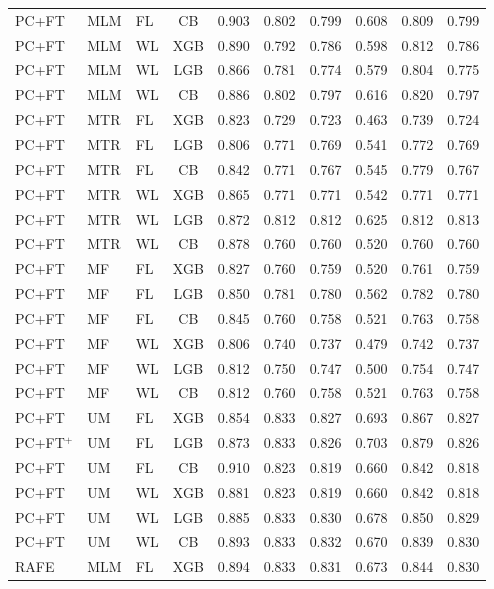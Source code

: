 \documentclass[9pt,a4paper]{article}
\begin{document}
\begin{scriptsize}
\begin{longtable}{lllcrrrrrr}
PC+FT & MLM & FL & CB  & 0.903 & 0.802 & 0.799 & 0.608 & 0.809 & 0.799 \\
PC+FT & MLM & WL & XGB & 0.890 & 0.792 & 0.786 & 0.598 & 0.812 & 0.786 \\
PC+FT & MLM & WL & LGB & 0.866 & 0.781 & 0.774 & 0.579 & 0.804 & 0.775 \\
PC+FT & MLM & WL & CB  & 0.886 & 0.802 & 0.797 & 0.616 & 0.820 & 0.797 \\
PC+FT & MTR & FL & XGB & 0.823 & 0.729 & 0.723 & 0.463 & 0.739 & 0.724 \\
PC+FT & MTR & FL & LGB & 0.806 & 0.771 & 0.769 & 0.541 & 0.772 & 0.769 \\
PC+FT & MTR & FL & CB  & 0.842 & 0.771 & 0.767 & 0.545 & 0.779 & 0.767 \\
PC+FT & MTR & WL & XGB & 0.865 & 0.771 & 0.771 & 0.542 & 0.771 & 0.771 \\
PC+FT & MTR & WL & LGB & 0.872 & 0.812 & 0.812 & 0.625 & 0.812 & 0.813 \\
PC+FT & MTR & WL & CB  & 0.878 & 0.760 & 0.760 & 0.520 & 0.760 & 0.760 \\
PC+FT & MF  & FL & XGB & 0.827 & 0.760 & 0.759 & 0.520 & 0.761 & 0.759 \\
PC+FT & MF  & FL & LGB & 0.850 & 0.781 & 0.780 & 0.562 & 0.782 & 0.780 \\
PC+FT & MF  & FL & CB  & 0.845 & 0.760 & 0.758 & 0.521 & 0.763 & 0.758 \\
PC+FT & MF  & WL & XGB & 0.806 & 0.740 & 0.737 & 0.479 & 0.742 & 0.737 \\
PC+FT & MF  & WL & LGB & 0.812 & 0.750 & 0.747 & 0.500 & 0.754 & 0.747 \\
PC+FT & MF  & WL & CB  & 0.812 & 0.760 & 0.758 & 0.521 & 0.763 & 0.758 \\
PC+FT & UM  & FL & XGB & 0.854 & 0.833 & 0.827 & 0.693 & 0.867 & 0.827 \\
PC+FT$^+$ & UM & FL & LGB & 0.873 & 0.833 & 0.826 & 0.703 & 0.879 & 0.826 \\
PC+FT & UM  & FL & CB  & 0.910 & 0.823 & 0.819 & 0.660 & 0.842 & 0.818 \\
PC+FT & UM  & WL & XGB & 0.881 & 0.823 & 0.819 & 0.660 & 0.842 & 0.818 \\
PC+FT & UM  & WL & LGB & 0.885 & 0.833 & 0.830 & 0.678 & 0.850 & 0.829 \\
PC+FT & UM  & WL & CB  & 0.893 & 0.833 & 0.832 & 0.670 & 0.839 & 0.830 \\
\midrule
RAFE & MLM & FL & XGB & 0.894 & 0.833 & 0.831 & 0.673 & 0.844 & 0.830 \\

\end{longtable}
\end{scriptsize}
\end{document}

